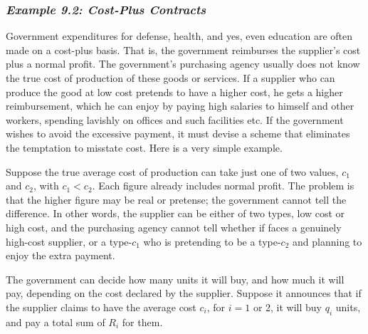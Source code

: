 \subsubsection*{\textit{Example 9.2: Cost-Plus Contracts}}

Government expenditures for defense, health, and yes, even education are often made on a cost-plus basis. That is, the government reimburses the supplier's cost plus a normal profit. The government's purchasing agency usually does not know the true cost of production of these goods or services. If a supplier who can produce the good at low cost pretends to have a higher cost, he gets a higher reimbursement, which he can enjoy by paying high salaries to himself and other workers, spending lavishly on offices and such facilities etc. If the government wishes to avoid the excessive payment, it must devise a scheme that eliminates the temptation to misstate cost. Here is a very simple example.

Suppose the true average cost of production can take just one of two values, $c_1$ and $c_2$, with $c_1 < c_2$. Each figure already includes normal profit. The problem is that the higher figure may be real or pretense; the government cannot tell the difference. In other words, the supplier can be either of two types, low cost or high cost, and the purchasing agency cannot tell whether if faces a genuinely high-cost supplier, or a type-$c_1$ who is pretending to be a type-$c_2$ and planning to enjoy the extra payment.

The government can decide how many units it will buy, and how much it will pay, depending on the cost declared by the supplier. Suppose it announces that if the supplier claims to have the average cost $c_i$, for $i=1$ or 2, it will buy $q_i$ units, and pay a total sum of $R_i$ for them.

